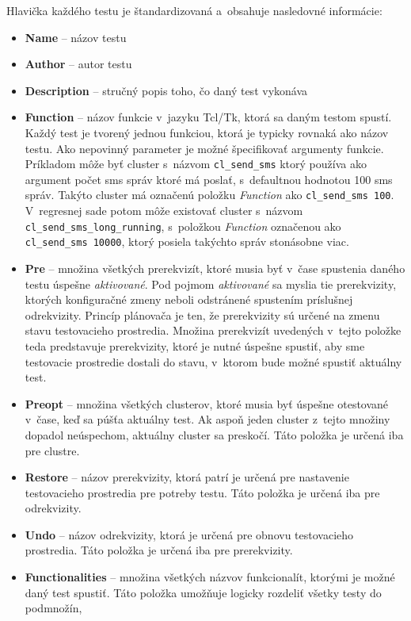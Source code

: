 Hlavička každého testu je štandardizovaná a~obsahuje nasledovné informácie:
\begin{itemize}
\item \textbf{Name} -- názov testu
\item \textbf{Author} -- autor testu
\item \textbf{Description} -- stručný popis toho, čo daný test vykonáva
\item \textbf{Function} -- názov funkcie v~jazyku Tcl/Tk, ktorá sa daným 
testom spustí. Každý test je tvorený jednou funkciou, ktorá je typicky 
rovnaká ako názov testu. Ako nepovinný parameter je možné špecifikovať 
argumenty funkcie. Príkladom môže byť cluster s~názvom 
\texttt{cl\_send\_sms} ktorý používa ako argument počet sms správ ktoré 
má poslať, s~defaultnou hodnotou 100 sms správ.
Takýto cluster má označenú položku \textit{Function} ako \texttt{cl\_send\_sms 100}. 
V~regresnej sade potom môže existovať cluster s~názvom 
\texttt{cl\_send\_sms\_long\_running}, s~položkou \textit{Function}
označenou ako \texttt{cl\_send\_sms 10000}, ktorý 
posiela takýchto správ stonásobne viac.
\item \textbf{Pre} -- množina všetkých prerekvizít, ktoré musia byť 
v~čase spustenia daného testu úspešne \textit{aktivované}. 
Pod pojmom \textit{aktivované} sa myslia tie prerekvizity, ktorých konfiguračné
zmeny neboli odstránené spustením príslušnej odrekvizity.
Princíp plánovača je ten, že prerekvizity sú určené na zmenu stavu 
testovacieho prostredia. Množina prerekvizít uvedených v~tejto položke 
teda predstavuje prerekvizity, ktoré je nutné úspešne spustiť, aby sme 
testovacie prostredie dostali do stavu, v~ktorom bude možné spustiť 
aktuálny test.
\item \textbf{Preopt} -- množina všetkých clusterov, ktoré musia byť 
úspešne otestované v~čase, keď sa púšťa aktuálny test. 
Ak aspoň jeden cluster z~tejto množiny dopadol neúspechom, aktuálny 
cluster sa preskočí. Táto položka je určená iba pre clustre.
\item \textbf{Restore} -- názov prerekvizity, ktorá patrí je určená pre 
nastavenie testovacieho prostredia pre potreby testu. 
Táto položka je určená iba pre odrekvizity.
\item \textbf{Undo} -- názov odrekvizity, ktorá je určená pre obnovu 
testovacieho prostredia. Táto položka je určená iba pre prerekvizity. 
\item \textbf{Functionalities} -- množina všetkých názvov funkcionalít, 
ktorými je možné daný test spustiť. 
Táto položka umožňuje logicky rozdeliť všetky testy do podmnožín, 

\end{itemize}
